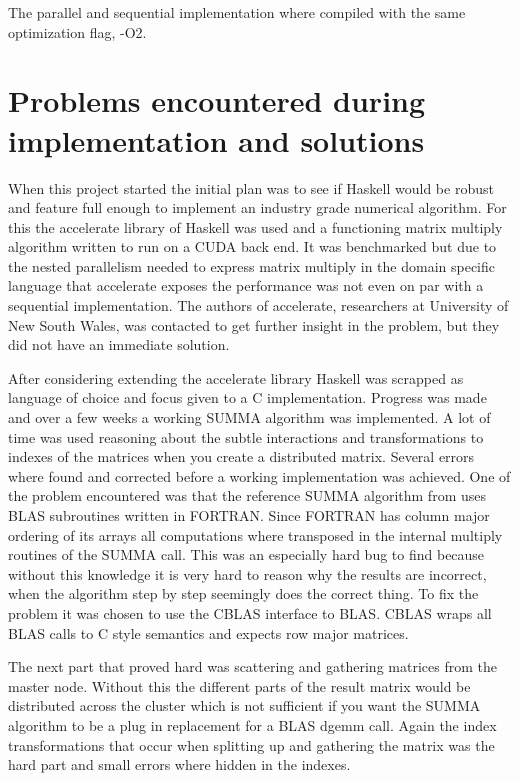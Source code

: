 \documentclass{article}
\begin{document}
The parallel and sequential implementation where compiled with the same optimization
flag, -O2.

\section{Problems encountered during implementation and solutions}
When this project started the initial plan was to see if Haskell\cite{haskell}
would be robust and feature full enough to implement an industry grade
numerical algorithm. For this the accelerate\cite{accelerate}
library of Haskell was used and a functioning matrix multiply algorithm written to run on a CUDA
back end. It was benchmarked but due to the nested parallelism needed to express matrix multiply
in the domain specific language that accelerate exposes the performance was not even on par
with a sequential implementation. The authors of accelerate, researchers at University of New South Wales,
was contacted to get further insight in the problem, but they did not have an immediate solution.

After considering extending the accelerate library Haskell was scrapped as language of choice and
focus given to a C implementation. Progress was made and over a few weeks a working SUMMA algorithm
was implemented. A lot of time was used reasoning about the subtle interactions and transformations
to indexes of the matrices when you create a distributed matrix. Several errors where found and
corrected before a working implementation was achieved. One of the problem encountered was that
the reference SUMMA algorithm from \cite{summa} uses BLAS subroutines written in FORTRAN.
Since FORTRAN has column major ordering
of its arrays all computations where transposed in the internal multiply routines of the SUMMA call.
This was an especially hard bug to find because without this knowledge it is very hard to reason
why the results are incorrect, when the algorithm step by step seemingly does the correct thing.
To fix the problem it was chosen to use the CBLAS interface to BLAS. CBLAS wraps all BLAS calls
to C style semantics and expects row major matrices.

The next part that proved hard was scattering and gathering matrices from the master node.
Without this the different parts of the result matrix would be distributed across the cluster
which is not sufficient if you want the SUMMA algorithm to be a plug in replacement for a
BLAS dgemm call. Again the index transformations that occur when splitting up and gathering
the matrix was the hard part and small errors where hidden in the indexes.
\end{document}
